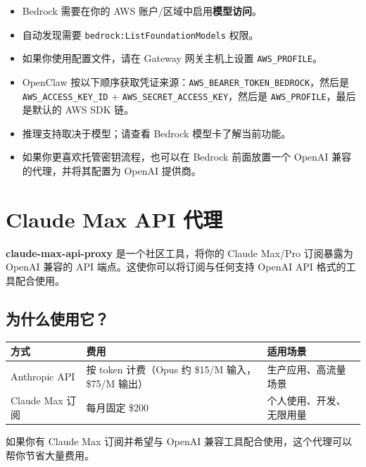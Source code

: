 \begin{itemize}
  \item Bedrock 需要在你的 AWS 账户/区域中启用\textbf{模型访问}。
  \item 自动发现需要 \texttt{bedrock:ListFoundationModels} 权限。
  \item 如果你使用配置文件，请在 Gateway 网关主机上设置 \texttt{AWS\_PROFILE}。
  \item OpenClaw 按以下顺序获取凭证来源：\texttt{AWS\_BEARER\_TOKEN\_BEDROCK}，然后是 \texttt{AWS\_ACCESS\_KEY\_ID} + \texttt{AWS\_SECRET\_ACCESS\_KEY}，然后是 \texttt{AWS\_PROFILE}，最后是默认的 AWS SDK 链。
  \item 推理支持取决于模型；请查看 Bedrock 模型卡了解当前功能。
  \item 如果你更喜欢托管密钥流程，也可以在 Bedrock 前面放置一个 OpenAI 兼容的代理，并将其配置为 OpenAI 提供商。
\end{itemize}



\clearpage

\section{Claude Max API 代理}


\textbf{claude-max-api-proxy} 是一个社区工具，将你的 Claude Max/Pro 订阅暴露为 OpenAI 兼容的 API 端点。这使你可以将订阅与任何支持 OpenAI API 格式的工具配合使用。

\subsection{为什么使用它？}



\begin{table}[h]
\centering
\small
\begin{tabular}{|l|l|l|}
\hline
方式 & 费用 & 适用场景 \\
\hline
Anthropic API & 按 token 计费（Opus 约 \$15/M 输入，\$75/M 输出） & 生产应用、高流量场景 \\
\hline
Claude Max 订阅 & 每月固定 \$200 & 个人使用、开发、无限用量 \\
\hline
\end{tabular}
\end{table}



如果你有 Claude Max 订阅并希望与 OpenAI 兼容工具配合使用，这个代理可以帮你节省大量费用。

